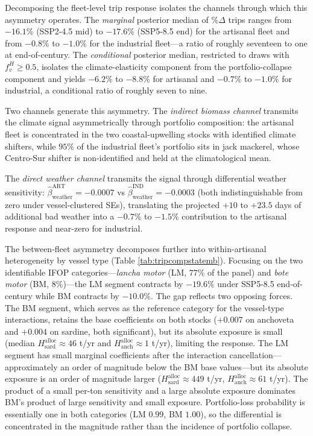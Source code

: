\documentclass[
  11pt,
]{article}
\begin{document}
Decomposing the fleet-level trip response isolates the channels through which this asymmetry operates. The \emph{marginal} posterior median of \(\%\Delta\) trips ranges from \(-16.1\%\) (SSP2-4.5 mid) to \(-17.6\%\) (SSP5-8.5 end) for the artisanal fleet and from \(-0.8\%\) to \(-1.0\%\) for the industrial fleet---a ratio of roughly seventeen to one at end-of-century. The \emph{conditional} posterior median, restricted to draws with \(f^H_v \geq 0.5\), isolates the climate-elasticity component from the portfolio-collapse component and yields \(-6.2\%\) to \(-8.8\%\) for artisanal and \(-0.7\%\) to \(-1.0\%\) for industrial, a conditional ratio of roughly seven to nine.

Two channels generate this asymmetry. The \emph{indirect biomass channel} transmits the climate signal asymmetrically through portfolio composition: the artisanal fleet is concentrated in the two coastal-upwelling stocks with identified climate shifters, while \(95\%\) of the industrial fleet's portfolio sits in jack mackerel, whose Centro-Sur shifter is non-identified and held at the climatological mean.

The \emph{direct weather channel} transmits the signal through differential weather sensitivity: \(\hat{\beta}_{\text{weather}}^{\text{ART}} = -0.0007\) vs \(\hat{\beta}_{\text{weather}}^{\text{IND}} = -0.0003\) (both indistinguishable from zero under vessel-clustered SEs), translating the projected \(+10\) to \(+23.5\) days of additional bad weather into a \(-0.7\%\) to \(-1.5\%\) contribution to the artisanal response and near-zero for industrial.

The between-fleet asymmetry decomposes further into within-artisanal heterogeneity by vessel type (Table \ref{tab:tripcompstatemb}). Focusing on the two identifiable IFOP categories---\emph{lancha motor} (LM, \(77\%\) of the panel) and \emph{bote motor} (BM, \(8\%\))---the LM segment contracts by \(-19.6\%\) under SSP5-8.5 end-of-century while BM contracts by \(-10.0\%\). The gap reflects two opposing forces. The BM segment, which serves as the reference category for the vessel-type interactions, retains the base coefficients on both stocks (\(+0.007\) on anchoveta and \(+0.004\) on sardine, both significant), but its absolute exposure is small (median \(H^{\text{alloc}}_{\text{sard}} \approx 46\) t/yr and \(H^{\text{alloc}}_{\text{anch}} \approx 1\) t/yr), limiting the response. The LM segment has small marginal coefficients after the interaction cancellation---approximately an order of magnitude below the BM base values---but its absolute exposure is an order of magnitude larger (\(H^{\text{alloc}}_{\text{sard}} \approx 449\) t/yr, \(H^{\text{alloc}}_{\text{anch}} \approx 61\) t/yr). The product of a small per-ton sensitivity and a large absolute exposure dominates BM's product of large sensitivity and small exposure. Portfolio-loss probability is essentially one in both categories (LM \(0.99\), BM \(1.00\)), so the differential is concentrated in the magnitude rather than the incidence of portfolio collapse.
\end{document}
